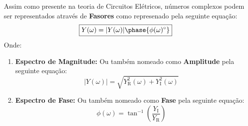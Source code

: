 \documentclass{article}
\begin{document}
                Assim como presente na teoria de Circuitos Elétricos, números complexos podem ser representados através de \textbf{Fasores} como represenado pela seguinte equação:
                    \begin{equation}
                        \boxed{
                            Y(\omega) = |Y(\omega)| \phase{\phi(\omega)^{\circ}}
                        }
                    \end{equation}
                Onde:
                    \begin{enumerate}[noitemsep]
                        \item \textbf{Espectro de Magnitude:} Ou também nomeado como \textbf{Amplitude} pela seguinte equação:
                            \begin{equation*}
                                \boxed{
                                    |Y(\omega)| = \sqrt{Y_{\text{R}}^{2}(\omega) + Y_{\text{I}}^{2}(\omega)}
                                }
                            \end{equation*}

                        \item \textbf{Espectro de Fase:} Ou também nomeado como \textbf{Fase} pela seguinte equação:
                            \begin{equation*}
                                \boxed{
                                    \phi(\omega) = \tan^{-1}
                                    \left(
                                        \frac{Y_{\text{I}}}{Y_{\text{R}}}
                                    \right)
                                }
                            \end{equation*}
                    \end{enumerate}
\end{document}
